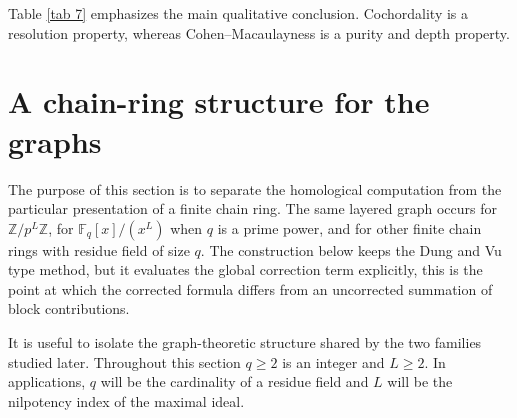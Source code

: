 \documentclass[12pt]{article}
\theoremstyle{definition}
\begin{document}
\medskip

Table \ref{tab 7} emphasizes the main qualitative conclusion.  Cochordality is a resolution property, whereas Cohen--Macaulayness is a purity and depth property.

\section{A chain-ring structure for the graphs}\label{sec:chain-template}
 The purpose of this section is to separate the homological computation from the particular presentation of a finite chain ring.  The same layered graph occurs for $\mathbb{Z}/p^L\mathbb{Z}$, for $\mathbb F_q[x]/(x^L)$ when $q$ is a prime power, and for other finite chain rings with residue field of size $q$.  The construction below keeps the Dung and Vu \cite{DungVu2026} type method, but it evaluates the global correction term explicitly, this is the point at which the corrected formula differs from an uncorrected summation of block contributions.

\medskip

It is useful to isolate the graph-theoretic structure shared by the two families studied later.  Throughout this section $q\geq 2$ is an integer and $L\geq 2$.  In applications, $q$ will be the cardinality of a residue field and $L$ will be the nilpotency index of the maximal ideal.

\medskip
\end{document}
